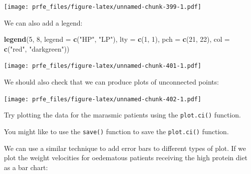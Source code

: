\documentclass[12pt,a4paper]{book}
\newenvironment{Shaded}{\begin{snugshade}}{\end{snugshade}}
\newcommand{\KeywordTok}[1]{\textcolor[rgb]{0.13,0.29,0.53}{\textbf{#1}}}
\newcommand{\DataTypeTok}[1]{\textcolor[rgb]{0.13,0.29,0.53}{#1}}
\newcommand{\DecValTok}[1]{\textcolor[rgb]{0.00,0.00,0.81}{#1}}
\newcommand{\StringTok}[1]{\textcolor[rgb]{0.31,0.60,0.02}{#1}}
\newcommand{\OperatorTok}[1]{\textcolor[rgb]{0.81,0.36,0.00}{\textbf{#1}}}
\newcommand{\NormalTok}[1]{#1}
\theoremstyle{definition}
\theoremstyle{definition}
\theoremstyle{definition}
\theoremstyle{remark}
\begin{document}
\texttt{[image: prfe\_files/figure-latex/unnamed-chunk-399-1.pdf]}

We can also add a legend:

\begin{Shaded}
\begin{Highlighting}[]
\KeywordTok{legend}\NormalTok{(}\DecValTok{5}\NormalTok{, }\DecValTok{8}\NormalTok{, }\DataTypeTok{legend =} \KeywordTok{c}\NormalTok{(}\StringTok{"HP"}\NormalTok{, }\StringTok{"LP"}\NormalTok{), }\DataTypeTok{lty =} \KeywordTok{c}\NormalTok{(}\DecValTok{1}\NormalTok{, }\DecValTok{1}\NormalTok{),}
       \DataTypeTok{pch =} \KeywordTok{c}\NormalTok{(}\DecValTok{21}\NormalTok{, }\DecValTok{22}\NormalTok{), }\DataTypeTok{col =} \KeywordTok{c}\NormalTok{(}\StringTok{"red"}\NormalTok{, }\StringTok{"darkgreen"}\NormalTok{))}
\end{Highlighting}
\end{Shaded}

\texttt{[image: prfe\_files/figure-latex/unnamed-chunk-401-1.pdf]}

We should also check that we can produce plots of unconnected points:

\begin{Shaded}
\end{Shaded}

\texttt{[image: prfe\_files/figure-latex/unnamed-chunk-402-1.pdf]}

Try plotting the data for the marasmic patients using the
\texttt{plot.ci()} function.

You might like to use the \texttt{save()} function to save the
\texttt{plot.ci()} function.

We can use a similar technique to add error bars to different types of
plot. If we plot the weight velocities for oedematous patients receiving
the high protein diet as a bar chart:

\begin{Shaded}
\end{Shaded}
\end{document}
